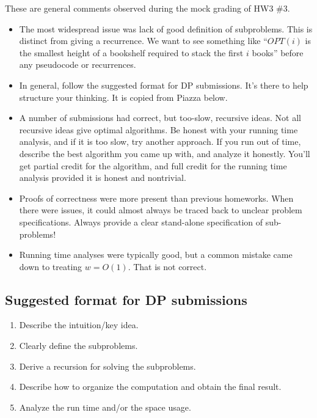 \documentclass[11pt]{article}
\begin{document}
\noindent
{}

\bigskip
\medskip

\noindent
These are general comments observed during the mock grading of HW3 \#3.


\begin{itemize}
  \item The most widespread issue was lack of good definition of
    subproblems. This is distinct from giving a recurrence.
    We want to see something like ``\(OPT(i)\) is the smallest height of
    a bookshelf required to stack the first \(i\) books'' before any
    pseudocode or recurrences.

  \item In general, follow the suggested format for DP submissions. It's
    there to help structure your thinking. It is copied from Piazza
    below.

  \item A number of submissions had correct, but too-slow, recursive
    ideas. Not all recursive ideas give optimal algorithms. Be honest
    with your running time analysis, and if it is too slow, try another
    approach. If you run out of time, describe the best algorithm you
    came up with, and analyze it honestly. You'll get partial credit for
    the algorithm, and full credit for the running time analysis
    provided it is honest and nontrivial.

  \item Proofs of correctness were more present than previous homeworks.
    When there were issues, it could almost always be traced back to
    unclear problem specifications. Always provide a clear stand-alone
    specification of sub-problems!

  \item Running time analyses were typically good, but a common mistake
    came down to treating \(w = O(1)\). That is not correct.

\end{itemize}


\subsection*{Suggested format for DP submissions}
\begin{enumerate}
  \item Describe the intuition/key idea.
  \item Clearly define the subproblems. 
  \item Derive a recursion for solving the subproblems.
  \item Describe how to organize the computation and obtain the final result.
  \item Analyze the run time and/or the space usage.
\end{enumerate}
\end{document}

